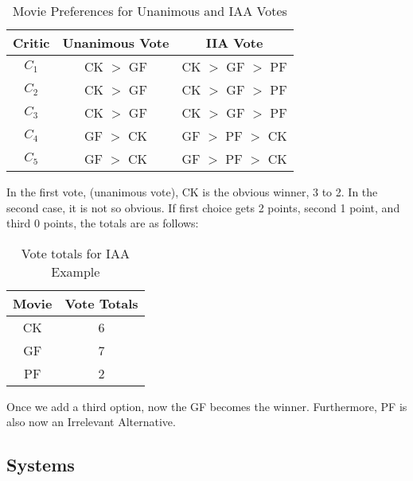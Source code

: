 \documentclass[twoside]{article}
\begin{document}
\begin{table}[H]
    \centering
     \begin{tabular}{c|c|c}
     Critic & Unanimous Vote & IIA Vote \\ \hline
     $C_1$ & CK $>$ GF & CK $>$ GF $>$ PF \\
     $C_2$ & CK $>$ GF & CK $>$ GF $>$ PF \\
     $C_3$ & CK $>$ GF & CK $>$ GF $>$ PF \\
     $C_4$ & GF $>$ CK & GF $>$ PF $>$ CK \\
     $C_5$ & GF $>$ CK & GF $>$ PF $>$ CK 
    \end{tabular}
    \caption{Movie Preferences for Unanimous and IAA Votes}
    \label{tab:ex7}
\end{table}


In the first vote, (unanimous vote), CK is the obvious winner, 3 to 2.  In the second case, it is not so obvious.  If first choice gets 2 points, second 1 point, and third 0 points, the totals are as follows:

\begin{table}[H]
    \centering
     \begin{tabular}{c|c}
        Movie & Vote Totals \\ \hline
        CK & 6 \\
        GF & 7 \\
        PF & 2
    \end{tabular}
    \caption{Vote totals for IAA Example}
    \label{tab:ex8}
\end{table}


Once we add a third option, now the GF becomes the winner.  Furthermore, PF is also now an Irrelevant Alternative.

\subsection{Systems}

\newcommand{\xmark}{\textcolor{red}{\ding{55}}}%
\newcommand{\cmark}{\textcolor{green}{\ding{51}}}%
\end{document}
